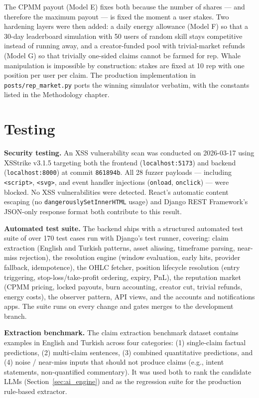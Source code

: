 \documentclass[a4paper,12pt]{report}
\begin{document}
The CPMM payout (Model E) fixes both because the number of shares --- and therefore the maximum payout --- is fixed the moment a user stakes. Two hardening layers were then added: a daily energy allowance (Model F) so that a 30-day leaderboard simulation with 50 users of random skill stays competitive instead of running away, and a creator-funded pool with trivial-market refunds (Model G) so that trivially one-sided claims cannot be farmed for rep. Whale manipulation is impossible by construction: stakes are fixed at 10 rep with one position per user per claim. The production implementation in \texttt{posts/rep\_market.py} ports the winning simulator verbatim, with the constants listed in the Methodology chapter.

\section{Testing}

\textbf{Security testing.} An XSS vulnerability scan was conducted on 2026-03-17 using XSStrike v3.1.5 targeting both the frontend (\texttt{localhost:5173}) and backend (\texttt{localhost:8000}) at commit \texttt{861894b}. All 28 fuzzer payloads --- including \texttt{<script>}, \texttt{<svg>}, and event handler injections (\texttt{onload}, \texttt{onclick}) --- were blocked. No XSS vulnerabilities were detected. React's automatic content escaping (no \texttt{dangerouslySetInnerHTML} usage) and Django REST Framework's JSON-only response format both contribute to this result.

\textbf{Automated test suite.} The backend ships with a structured automated test suite of over 170 test cases run with Django's test runner, covering: claim extraction (English and Turkish patterns, asset aliasing, timeframe parsing, near-miss rejection), the resolution engine (window evaluation, early hits, provider fallback, idempotence), the OHLC fetcher, position lifecycle resolution (entry triggering, stop-loss/take-profit ordering, expiry, PnL), the reputation market (CPMM pricing, locked payouts, burn accounting, creator cut, trivial refunds, energy costs), the observer pattern, API views, and the accounts and notifications apps. The suite runs on every change and gates merges to the development branch.

\textbf{Extraction benchmark.} The claim extraction benchmark dataset contains examples in English and Turkish across four categories: (1) single-claim factual predictions, (2) multi-claim sentences, (3) combined quantitative predictions, and (4) noise / near-miss inputs that should not produce claims (e.g., intent statements, non-quantified commentary). It was used both to rank the candidate LLMs (Section~\ref{sec:ai_engine}) and as the regression suite for the production rule-based extractor.
\end{document}

